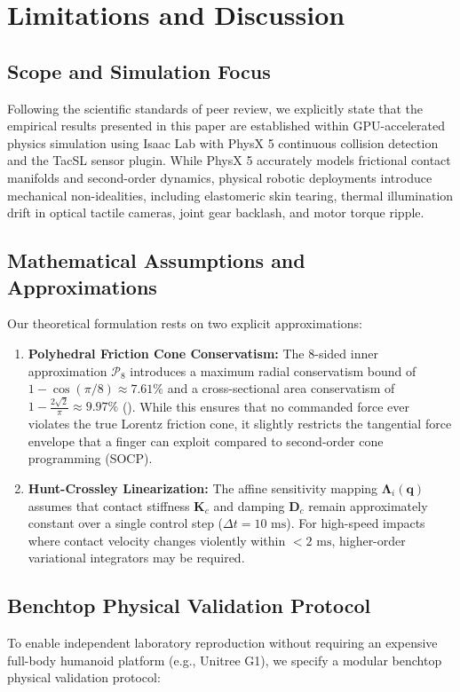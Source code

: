 \section{Limitations and Discussion}
\label{sec:limitations}

\subsection{Scope and Simulation Focus}
Following the scientific standards of peer review, we explicitly state that the empirical results presented in this paper are established within GPU-accelerated physics simulation using Isaac Lab with PhysX 5 continuous collision detection and the TacSL sensor plugin. While PhysX 5 accurately models frictional contact manifolds and second-order dynamics, physical robotic deployments introduce mechanical non-idealities, including elastomeric skin tearing, thermal illumination drift in optical tactile cameras, joint gear backlash, and motor torque ripple.

\subsection{Mathematical Assumptions and Approximations}
Our theoretical formulation rests on two explicit approximations:
\begin{enumerate}
    \item \textbf{Polyhedral Friction Cone Conservatism:} The 8-sided inner approximation $\mathcal{P}_8$ introduces a maximum radial conservatism bound of $1 - \cos(\pi/8) \approx 7.61\%$ and a cross-sectional area conservatism of $1 - \frac{2\sqrt{2}}{\pi} \approx 9.97\%$ (). While this ensures that no commanded force ever violates the true Lorentz friction cone, it slightly restricts the tangential force envelope that a finger can exploit compared to second-order cone programming (SOCP).
    \item \textbf{Hunt-Crossley Linearization:} The affine sensitivity mapping $\mathbf{\Lambda}_i(\mathbf{q})$ assumes that contact stiffness $\mathbf{K}_c$ and damping $\mathbf{D}_c$ remain approximately constant over a single control step ($\Delta t = 10\text{ ms}$). For high-speed impacts where contact velocity changes violently within $< 2\text{ ms}$, higher-order variational integrators may be required.
\end{enumerate}

\subsection{Benchtop Physical Validation Protocol}
To enable independent laboratory reproduction without requiring an expensive full-body humanoid platform (e.g., Unitree G1), we specify a modular benchtop physical validation protocol:

